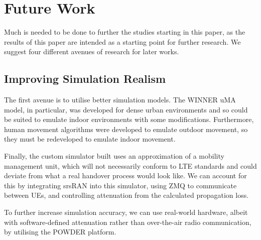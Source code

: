 \section{Future Work}
Much is needed to be done to further the studies starting in this paper, as the results of this paper are intended as a starting point for further research. We suggest four different avenues of research for later works.

\subsection{Improving Simulation Realism}
The first avenue is to utilise better simulation models. The WINNER uMA \insertref model, in particular, was developed for dense urban environments and so could be suited to emulate indoor environments with some modifications. Furthermore, human movement algorithms were developed to emulate outdoor movement, so they must be redeveloped to emulate indoor movement.

Finally, the custom simulator built uses an approximation of a mobility management unit, which will not necessarily conform to LTE standards and could deviate from what a real handover process would look like. We can account for this by integrating srsRAN into this simulator, using ZMQ to communicate between UEs, and controlling attenuation from the calculated propagation loss.

To further increase simulation accuracy, we can use real-world hardware, albeit with software-defined attenuation rather than over-the-air radio communication, by utilising the POWDER platform.


